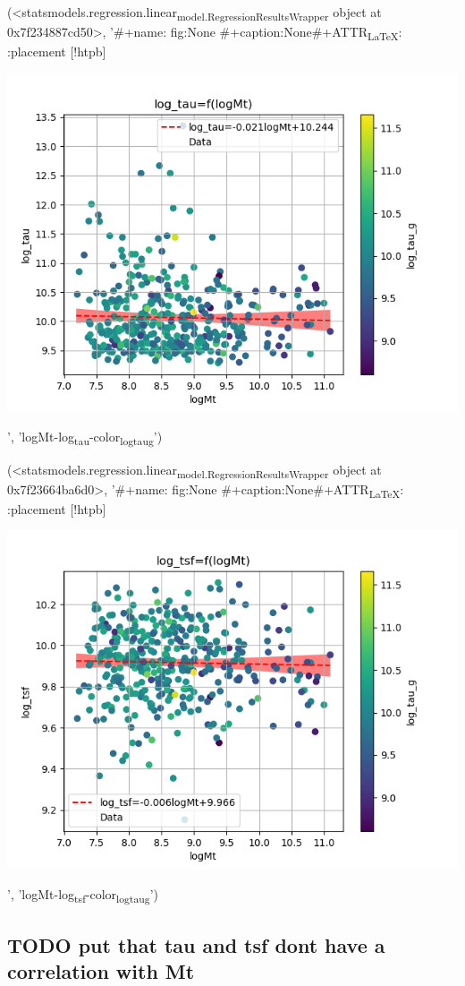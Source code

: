 \documentclass[a4paper,twocolumn]{article}
\begin{document}
(<statsmodels.regression.linear\textsubscript{model.RegressionResultsWrapper} object at 0x7f234887cd50>, '\#+name: fig:None \n\#+caption:None\n\#+ATTR\textsubscript{\LaTeX{}}: :placement [!htpb] \n\begin{center}
\includegraphics[width=.9\linewidth]{./figs/logMt-log_tau-color_log_tau_g.png}
\end{center}', 'logMt-log\textsubscript{tau}-color\textsubscript{log}\textsubscript{tau}\textsubscript{g}')

(<statsmodels.regression.linear\textsubscript{model.RegressionResultsWrapper} object at 0x7f23664ba6d0>, '\#+name: fig:None \n\#+caption:None\n\#+ATTR\textsubscript{\LaTeX{}}: :placement [!htpb] \n\begin{center}
\includegraphics[width=.9\linewidth]{./figs/logMt-log_tsf-color_log_tau_g.png}
\end{center}', 'logMt-log\textsubscript{tsf}-color\textsubscript{log}\textsubscript{tau}\textsubscript{g}')

\subsection{{\bfseries\sffamily TODO} put that tau and tsf dont have a correlation with Mt}
\label{sec:org8125488}

\pagebreak
\printbibliography
\end{document}
